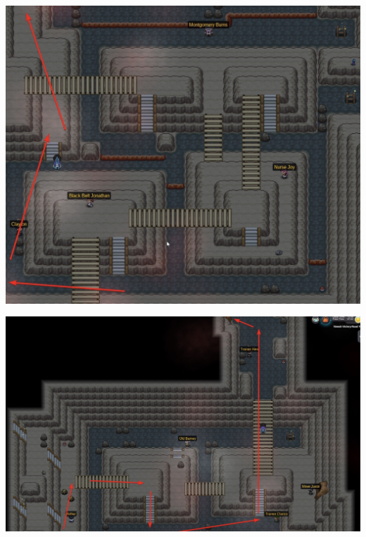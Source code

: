 \documentclass[11pt]{article}
\begin{document}
\includegraphics[width=\textwidth]{walkthrough/Sinnoh/victory-road-1}

\includegraphics[width=\textwidth]{walkthrough/Sinnoh/victory-road-2}



% 
% 



\thispagestyle{empty}
\listoffigures
\listoftables
\newpage
{}
\end{document}
